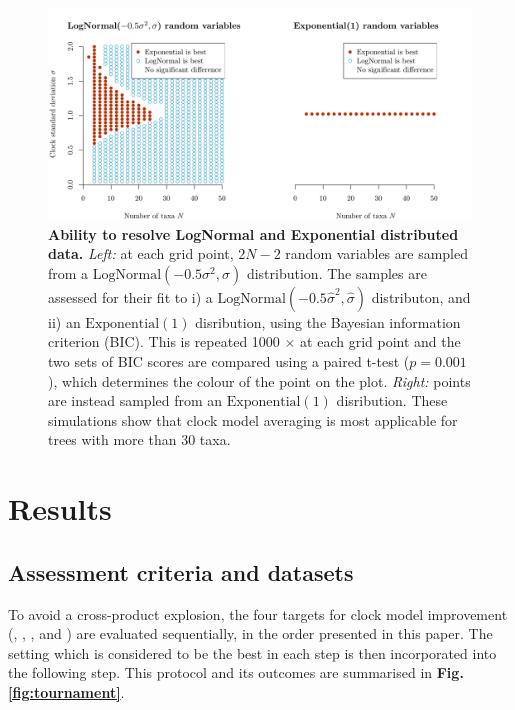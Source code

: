 \documentclass[10pt,letterpaper]{article}
\begin{document}
\begin{figure}[!h]
\includegraphics[width=\textwidth]{Figures/ClockModelAverging.pdf}
\caption{\textbf{Ability to resolve LogNormal and Exponential distributed data.} \textit{Left:} at each grid point, $2N-2$ random variables are sampled from a $\text{LogNormal}(-0.5\sigma^2, \sigma)$ distribution. The samples are assessed for their fit to i) a $\text{LogNormal}(-0.5\hat{\sigma}^2, \hat{\sigma})$ distributon, and ii) an $\text{Exponential}(1)$ disribution, using the Bayesian information criterion (BIC). This is repeated 1000 $\times$ at each grid point and the two sets of BIC scores are compared using a paired t-test ($p=0.001$), which determines the colour of the point on the plot. \textit{Right:} points are instead sampled from an $\text{Exponential}(1)$ disribution. These simulations show that clock model averaging is most applicable for trees with more than 30 taxa.   } 
\label{fig:ClockModelAverging}
\end{figure}




\section*{Results} \label{sect:results}




\subsection*{Assessment criteria and datasets}




To avoid a cross-product explosion, the four targets for clock model improvement (\textbf{}, \textbf{}, \textbf{}, and \textbf{}) are evaluated sequentially, in the order presented in this paper. The setting which is considered to be the best in each step is then incorporated into the following step. This protocol and its outcomes are summarised in \textbf{Fig. \ref{fig:tournament}}.
\end{document}
